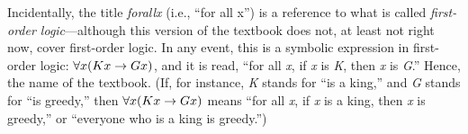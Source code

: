 Incidentally, the title \textit{forall\hspace{.10em}x} (i.e., ``for all x'') is a reference to what is called \textit{first-order logic}---although this version of the textbook does not, at least not right now, cover first-order logic. In any event, this is a symbolic expression in first-order logic: $\forall x(Kx \rightarrow Gx)$, and it is read, “for all \textit{x}, if \textit{x} is \textit{K}, then \textit{x} is \textit{G}.” Hence, the name of the textbook. (If, for instance, \textit{K} stands for ``is a king,'' and \textit{G} stands for ``is greedy,'' then $\forall x(Kx \rightarrow Gx)$ means ``for all \textit{x}, if \textit{x} is a king, then \textit{x} is greedy,'' or ``everyone who is a king is greedy.'') 